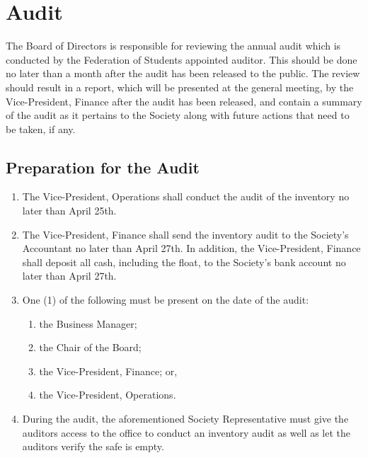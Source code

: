 \section{Audit}

The Board of Directors is responsible for reviewing the annual audit which is conducted 
by the Federation of Students appointed auditor. 
This should be done no later than a month after the audit has been released to the public. 
The review should result in a report, which will be presented at the general meeting, by 
the Vice-President, Finance after the audit has been released, and contain a summary of the 
audit as it pertains to the Society along with future actions that need to be taken, if any.

\subsection{Preparation for the Audit}
\begin{enumerate}
    \item The Vice-President, Operations shall conduct the audit of the inventory no later than April 25th.
    \item The Vice-President, Finance shall send the inventory audit to the Society's Accountant no later than April 27th. 
        In addition, the Vice-President, Finance shall deposit all cash, including the float, to the Society's bank account no later than April 27th.
    \item One (1) of the following must be present on the date of the audit: 
    \begin{enumerate}
        \item the Business Manager;
        \item the Chair of the Board;
        \item the Vice-President, Finance; or,
        \item the Vice-President, Operations.
    \end{enumerate}
    \item During the audit, the aforementioned Society Representative must give the auditors
        access to the office to conduct an inventory audit as well as let the auditors verify the safe is empty. 
\end{enumerate}

    

